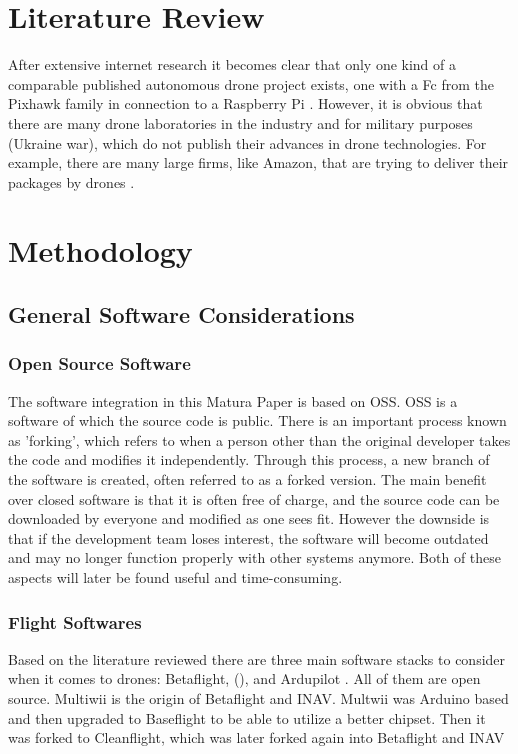 \documentclass[svgnames]{article}
\begin{document}
	\section{Literature Review}\label{literaturereview}
	After extensive internet research it becomes clear that only one kind of a comparable published autonomous drone project exists, one with a \gls{Fc} from the Pixhawk family in connection to a Raspberry Pi \cite{litpixall, litpixgir, litpixins}. However, it is obvious that there are many drone laboratories in the industry and for military purposes (Ukraine war), which do not publish their advances in drone technologies. For example, there are many large firms, like Amazon, that are trying to deliver their packages by drones \cite{amazondrone}.
	
	
	\section{Methodology}
	\subsection{General Software Considerations}

	\subsubsection{Open Source Software}
	The software integration in this Matura Paper is based on \gls{OSS}. \gls{OSS} is a software of which the source code is public. There is an important process known as 'forking', which refers to when a person other than the original developer takes the code and modifies it independently. Through this process, a new branch of the software is created, often referred to as a forked version. The main benefit over closed software is that it is often free of charge, and the source code can be downloaded by everyone and modified as one sees fit. However the downside is that if the development team loses interest, the software will become outdated and may no longer function properly with other systems anymore. Both of these aspects will later be found useful and time-consuming. 
	
	\subsubsection{Flight Softwares}
	Based on the literature reviewed there are three main software stacks to consider when it comes to drones: Betaflight, \myinav (), and Ardupilot  \cite{history}. All of them are open source. Multiwii is the origin of Betaflight and \gls{INAV}. Multwii was Arduino based and then upgraded to Baseflight to be able to utilize a better chipset. Then it was forked to Cleanflight, which was later forked again into Betaflight and \gls{INAV}
	
\end{document}
